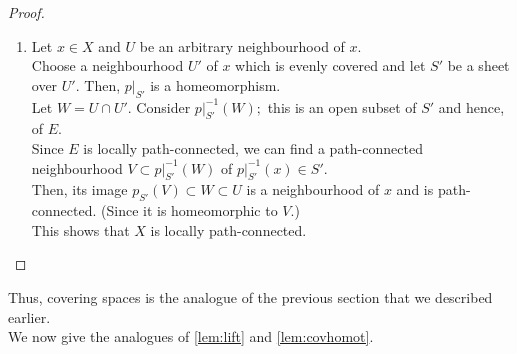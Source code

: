 \documentclass[12pt]{article}
\theoremstyle{definition}
\numberwithin{thm}{section}
\begin{document}
\begin{proof}
\begin{enumerate}
		\item Let $x \in X$ and $U$ be an arbitrary neighbourhood of $x.$\\
		Choose a neighbourhood $U'$ of $x$ which is evenly covered and let $S'$ be a sheet over $U'.$ Then, $p|_{S'}$ is a homeomorphism. \\
		Let $W = U \cap U'.$ Consider $p|_{S'}^{-1}(W);$ this is an open subset of $S'$ and hence, of $E.$\\
		Since $E$ is locally path-connected, we can find a path-connected neighbourhood $V \subset p|_{S'}^{-1}(W)$ of $p|_{S'}^{-1}(x) \in S'.$\\
		Then, its image $p_{S'}(V) \subset W \subset U$ is a neighbourhood of $x$ and is path-connected. (Since it is homeomorphic to $V.$)\\
		This shows that $X$ is locally path-connected. \qedhere
	\end{enumerate}
\end{proof}

Thus, covering spaces is the analogue of the previous section that we described earlier.\\
We now give the analogues of \cref{lem:lift} and \cref{lem:covhomot}.
\end{document}
